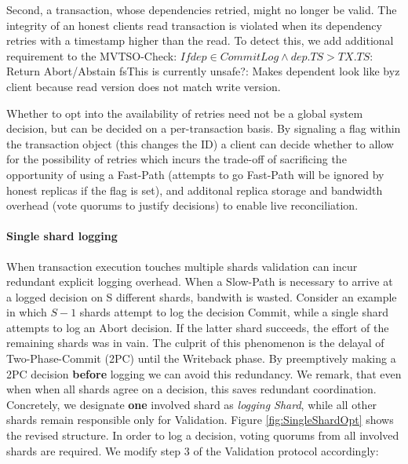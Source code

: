 Second, a transaction, whose dependencies retried, might no longer be valid. The integrity of an honest clients read transaction is violated when its dependency retries with a timestamp higher than the read. To detect this, we add additional requirement to the MVTSO-Check: $If dep \in CommitLog \land dep.TS > TX.TS:$ Return Abort/Abstain 
fs{This is currently unsafe?: Makes dependent look like byz client because read version does not match write version}.



Whether to opt into the availability of retries need not be a global system decision, but can be decided on a per-transaction basis. By signaling a flag within the transaction object (this changes the ID) a client can decide whether to allow for the possibility of retries which incurs the trade-off of sacrificing the opportunity of using a Fast-Path (attempts to go Fast-Path will be ignored by honest replicas if the flag is set), and additonal replica storage and bandwidth overhead (vote quorums to justify decisions) to enable live reconciliation.





\paragraph{Single shard logging}

When transaction execution touches multiple shards validation can incur redundant explicit logging overhead. When a Slow-Path is necessary to arrive at a logged decision on S different shards, bandwith is wasted. Consider an example in which $S-1$ shards attempt to log the decision Commit, while a single shard attempts to log an Abort decision. If the latter shard succeeds, the effort of the remaining shards was in vain. 
The culprit of this phenomenon is the delayal of Two-Phase-Commit (2PC) until the Writeback phase. By preemptively making a 2PC decision \textbf{before} logging we can avoid this redundancy. We remark, that even when when all shards agree on a decision, this saves redundant coordination.
Concretely, we designate \textbf{one} involved shard as \textit{logging Shard}, while all other shards remain responsible only for Validation. Figure \ref{fig:SingleShardOpt} shows the revised structure. In order to log a decision, voting quorums from all involved shards are required. We modify step 3 of the Validation protocol accordingly:

